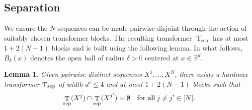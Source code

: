 \documentclass[pdflatex,sn-mathphys-num]{sn-jnl}%
\theoremstyle{thmstyleone}%
\newtheorem{lemma}[theorem]{Lemma}
\theoremstyle{thmstyletwo}%
\theoremstyle{thmstylethree}%
\numberwithin{equation}{section}
\newcommand{\R}{\mathbb{R}}
\DeclareMathOperator{\T}{\mathrm{T}}
\begin{document}
\subsection{Separation}\label{ss:separationStep}

We ensure the $N$ sequences can be made pairwise disjoint through the action of suitably chosen transformer blocks. 
The resulting transformer $\T_{\text{sep}}$ has at most $1 + 2(N-1)$ blocks and is built using the following lemma. In what follows, $B_\delta(x)$ denotes the open ball of radius $\delta > 0$ centered at $x\in \R^d$. 

\begin{lemma}\label{lem:splitOverlappingSequences}
Given pairwise distinct sequences $X^1,\ldots,X^N$, there exists a hardmax transformer $\T_\textnormal{sep}$ of width $d'\leq 4$ and at most $1 + 2(N-1)$ blocks such that
$$
\T_{\textnormal{sep}}({X}^j) \cap \T_\textnormal{sep}({X}^{j'}) = \emptyset \quad \text{for all} \; j\neq j'\in [N].
$$
\end{lemma}
\end{document}
